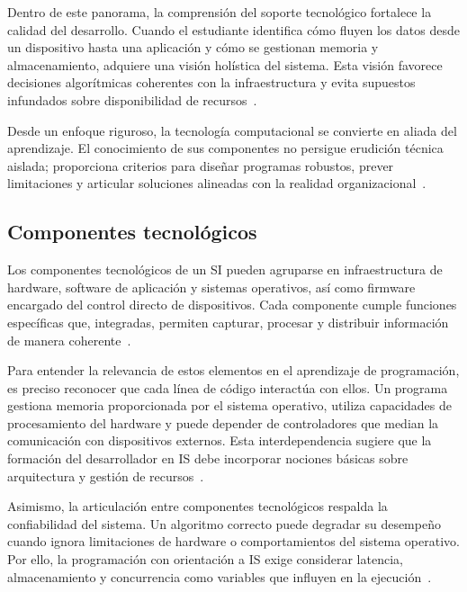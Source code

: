 \documentclass[12pt,twoside]{book}
\begin{document}
				Dentro de este panorama, la comprensión del soporte tecnológico fortalece la calidad del desarrollo. Cuando el estudiante identifica cómo fluyen los datos desde un dispositivo hasta una aplicación y cómo se gestionan memoria y almacenamiento, adquiere una visión holística del sistema. Esta visión favorece decisiones algorítmicas coherentes con la infraestructura y evita supuestos infundados sobre disponibilidad de recursos~\cite{Tanenbaum2021Structured,Laudon2020Management,Ghezzi2003Fundamentals}.
				
				Desde un enfoque riguroso, la tecnología computacional se convierte en aliada del aprendizaje. El conocimiento de sus componentes no persigue erudición técnica aislada; proporciona criterios para diseñar programas robustos, prever limitaciones y articular soluciones alineadas con la realidad organizacional~\cite{Kendall2014Systems,Tegarden2025Systems,Pressman2019Software}.
				
				\subsection{Componentes tecnológicos}
					\noindent
					Los componentes tecnológicos de un SI pueden agruparse en infraestructura de hardware, software de aplicación y sistemas operativos, así como firmware encargado del control directo de dispositivos. Cada componente cumple funciones específicas que, integradas, permiten capturar, procesar y distribuir información de manera coherente~\cite{Laudon2020Management,Tanenbaum2021Structured,Silberschatz2018Operating}.
					
					Para entender la relevancia de estos elementos en el aprendizaje de programación, es preciso reconocer que cada línea de código interactúa con ellos. Un programa gestiona memoria proporcionada por el sistema operativo, utiliza capacidades de procesamiento del hardware y puede depender de controladores que median la comunicación con dispositivos externos. Esta interdependencia sugiere que la formación del desarrollador en IS debe incorporar nociones básicas sobre arquitectura y gestión de recursos~\cite{Gaddis2022Starting,Silberschatz2018Operating,Ghezzi2003Fundamentals}.
					
					Asimismo, la articulación entre componentes tecnológicos respalda la confiabilidad del sistema. Un algoritmo correcto puede degradar su desempeño cuando ignora limitaciones de hardware o comportamientos del sistema operativo. Por ello, la programación con orientación a IS exige considerar latencia, almacenamiento y concurrencia como variables que influyen en la ejecución~\cite{Tanenbaum2021Structured,Sommerville2015Software,Pressman2019Software}.
					
\end{document}
